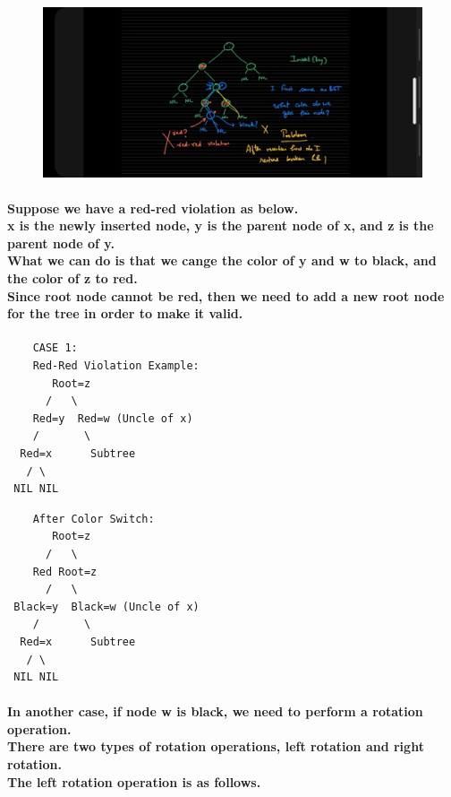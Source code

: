 \documentclass{article}
\begin{document}
\begin{figure}[H]
    \includegraphics[width=\textwidth]{rbtredredviolation.jpg}
\end{figure}


\paragraph{
    Suppose we have a red-red violation as below.\\
    x is the newly inserted node, y is the parent node of x, and z is the parent node of y.\\
    What we can do is that we  cange the color of y and w to black, and the color of z to red.\\
    Since root node cannot be red, then we need to add a new root node for the tree in order to make it valid.\\
}

\begin{verbatim}
    CASE 1:
    Red-Red Violation Example:
       Root=z
      /   \
    Red=y  Red=w (Uncle of x)
    /       \
  Red=x      Subtree
   / \
 NIL NIL
\end{verbatim}

\begin{verbatim}
    After Color Switch:
       Root=z
      /   \
    Red Root=z
      /   \
 Black=y  Black=w (Uncle of x)
    /       \
  Red=x      Subtree
   / \
 NIL NIL
\end{verbatim}


\paragraph{
    In another case, if node w is black, we need to perform a rotation operation.\\
    There are two types of rotation operations, left rotation and right rotation.\\
    The left rotation operation is as follows.\\
}
\end{document}

